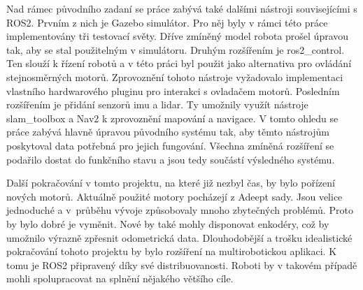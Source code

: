 Nad rámec původního zadaní se práce zabývá také dalšími nástroji souvisejícími s ROS2. Prvním z nich je Gazebo simulátor. Pro něj byly v rámci této práce implementovány tři testovací světy. Dříve zmíněný model robota prošel úpravou tak, aby se stal použitelným v simulátoru. Druhým rozšířením je ros2\_control. Ten slouží k řízení robotů a v této práci byl použit jako alternativa pro ovládání stejnosměrných motorů. Zprovoznění tohoto nástroje vyžadovalo implementaci vlastního hardwarového pluginu pro interakci s ovladačem motorů. Posledním rozšířením je přidání senzorů imu a lidar. Ty umožnily využít nástroje slam\_toolbox a Nav2 k zprovoznění mapování a navigace. V tomto ohledu se práce zabývá hlavně úpravou původního systému tak, aby těmto nástrojům poskytoval data potřebná pro jejich fungování. Všechna zmíněná rozšíření se podařilo dostat do funkčního stavu a jsou tedy součástí výsledného systému.

Další pokračování v tomto projektu, na které již nezbyl čas, by bylo pořízení nových motorů. Aktuálně  použité motory pocházejí z Adeept sady. Jsou velice jednoduché a v~průběhu vývoje způsobovaly mnoho zbytečných problémů. Proto by bylo dobré je vyměnit. Nové by také mohly disponovat enkodéry, což by umožnilo výrazně zpřesnit odometrická data.
Dlouhodobější a trošku idealistické pokračování tohoto projektu by bylo rozšíření na multirobotickou aplikaci. K tomu je ROS2 připravený díky své distribuovanosti. Roboti by v takovém případě mohli spolupracovat na splnění nějakého většího cíle.


%
